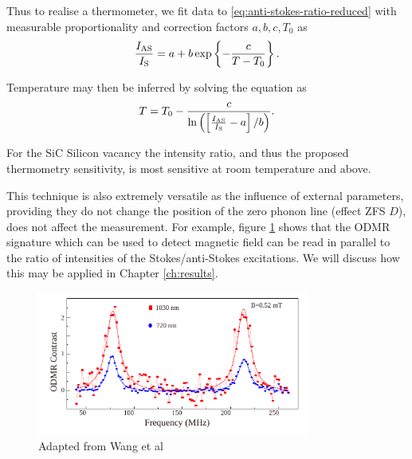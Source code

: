 Thus to realise a thermometer, we fit data to \eqref{eq:anti-stokes-ratio-reduced} with measurable proportionality and correction factors $a, b, c, T_0$ as \cite{Tran2019}
\begin{equation}
	\frac{I_{\ce{AS}}}{I_{\ce{S}}} = a +  b\exp\left\{-\frac{c}{T - T_0} \right\}.
	\label{eq:s1.5thermo_exponential}
\end{equation}

Temperature may then be inferred by solving the equation as
\begin{equation}
	T = T_0 - \frac{c}{\ln\left(\left[{\frac{I_{\ce{AS}}}{I_{\ce{S}}} - a}\right]/b\right)}.
	\label{eq:anti-stokes-solution}
\end{equation}

For the SiC Silicon vacancy the intensity ratio, and thus the proposed thermometry sensitivity, is most sensitive at room temperature and above.

This technique is also extremely versatile as the influence of external parameters, providing they do not change the position of the zero phonon line (effect ZFS $D$), does not affect the measurement. For example, figure \ref{fig:anti-stokes-ODMR} shows that the ODMR signature which can be used to detect magnetic field can be read in parallel to the ratio of intensities of the Stokes/anti-Stokes excitations. We will discuss how this may be applied in Chapter \ref{ch:results}.



\begin{figure}[h]
	\centering
	\includegraphics[width=0.8\textwidth]{figures/anti-stokes-ODMR.pdf}
	\caption{Adapted from Wang et al}\label{fig:anti-stokes-ODMR}
\end{figure}





